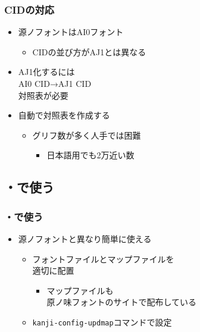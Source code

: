 \begin{frame}\frametitle{CIDの対応}
  \begin{itemize}
  \item 源ノフォントはAI0フォント
    \begin{itemize}
    \item CIDの並び方がAJ1とは異なる
    \end{itemize}
  \item AJ1化するには \\
    AI0 CID→AJ1 CID \\
    対照表が必要
  \item 自動で対照表を作成する
    \begin{itemize}
    \item グリフ数が多く人手では困難
      \begin{itemize}
        \item 日本語用でも2万近い数
      \end{itemize}
    \end{itemize}
  \end{itemize}
\end{frame}

\subsection{\pTeX ・\upTeX で使う}
\begin{frame}\frametitle{\pTeX ・\upTeX で使う}
  \begin{itemize}
  \item 源ノフォントと異なり簡単に使える
    \begin{itemize}
    \item フォントファイルとマップファイルを \\
      適切に配置
      \begin{itemize}
      \item マップファイルも \\
        原ノ味フォントのサイトで配布している
      \end{itemize}
    \item \texttt{kanji-config-updmap}コマンドで設定
    \end{itemize}
  \end{itemize}
\end{frame}

